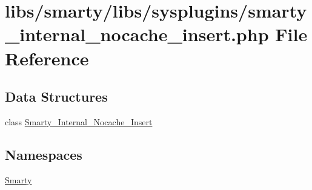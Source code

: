 \hypertarget{smarty__internal__nocache__insert_8php}{}\section{libs/smarty/libs/sysplugins/smarty\+\_\+internal\+\_\+nocache\+\_\+insert.php File Reference}
\label{smarty__internal__nocache__insert_8php}
\subsection*{Data Structures}
\begin{DoxyCompactItemize}
\item 
class \hyperlink{class_smarty___internal___nocache___insert}{Smarty\+\_\+\+Internal\+\_\+\+Nocache\+\_\+\+Insert}
\end{DoxyCompactItemize}
\subsection*{Namespaces}
\begin{DoxyCompactItemize}
\item 
 \hyperlink{namespace_smarty}{Smarty}
\end{DoxyCompactItemize}
